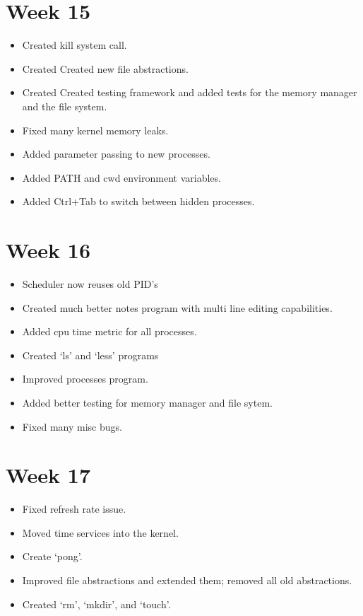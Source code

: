 \documentclass[a4paper]{report}
\begin{document}
\section{Week 15}
\begin{itemize}
\item Created kill system call.
\item Created Created new file abstractions.
\item Created Created testing framework and added tests for the memory manager and the file system.
\item Fixed many kernel memory leaks.
\item Added parameter passing to new processes.
\item Added PATH and cwd environment variables.
\item Added Ctrl+Tab to switch between hidden processes.
\end{itemize}

\section{Week 16}
\begin{itemize}
\item Scheduler now reuses old PID's
\item Created much better notes program with multi line editing capabilities.
\item Added cpu time metric for all processes.
\item Created `ls' and `less' programs
\item Improved processes program.
\item Added better testing for memory manager and file sytem.
\item Fixed many misc bugs.
\end{itemize}

\section{Week 17}
\begin{itemize}
\item Fixed refresh rate issue.
\item Moved time services into the kernel.
\item Create `pong'.
\item Improved file abstractions and extended them; removed all old abstractions.
\item Created `rm', `mkdir', and `touch'.
\end{itemize}
\end{document}

